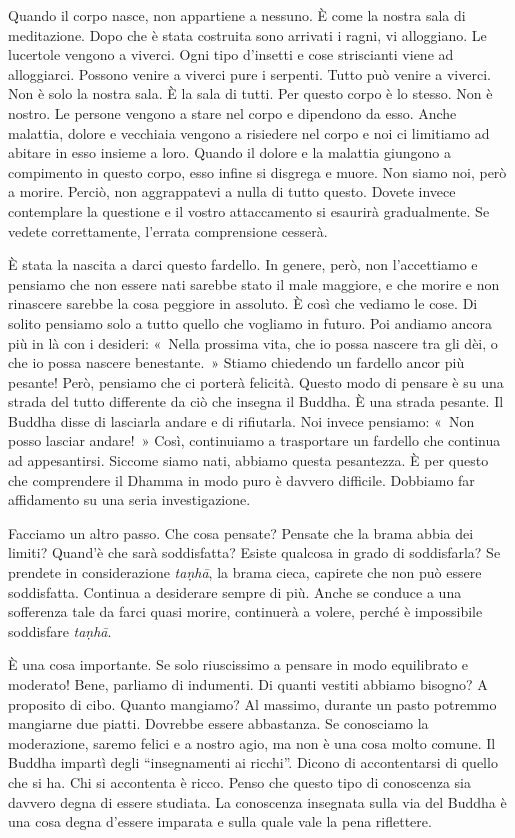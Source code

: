 Quando il corpo nasce, non appartiene a nessuno. È come la nostra sala
di meditazione. Dopo che è stata costruita sono arrivati i ragni, vi
alloggiano. Le lucertole vengono a viverci. Ogni tipo d'insetti e cose
striscianti viene ad alloggiarci. Possono venire a viverci pure i
serpenti. Tutto può venire a viverci. Non è solo la nostra sala. È la
sala di tutti. Per questo corpo è lo stesso. Non è nostro. Le persone
vengono a stare nel corpo e dipendono da esso. Anche malattia, dolore e
vecchiaia vengono a risiedere nel corpo e noi ci limitiamo ad abitare in
esso insieme a loro. Quando il dolore e la malattia giungono a
compimento in questo corpo, esso infine si disgrega e muore. Non siamo
noi, però a morire. Perciò, non aggrappatevi a nulla di tutto questo.
Dovete invece contemplare la questione e il vostro attaccamento si
esaurirà gradualmente. Se vedete correttamente, l'errata comprensione
cesserà.

È stata la nascita a darci questo fardello. In genere, però, non
l'accettiamo e pensiamo che non essere nati sarebbe stato il male
maggiore, e che morire e non rinascere sarebbe la cosa peggiore in
assoluto. È così che vediamo le cose. Di solito pensiamo solo a tutto
quello che vogliamo in futuro. Poi andiamo ancora più in là con i
desideri: «~Nella prossima vita, che io possa nascere tra gli dèi, o che
io possa nascere benestante.~» Stiamo chiedendo un fardello ancor più
pesante! Però, pensiamo che ci porterà felicità. Questo modo di pensare
è su una strada del tutto differente da ciò che insegna il Buddha. È una
strada pesante. Il Buddha disse di lasciarla andare e di rifiutarla. Noi
invece pensiamo: «~Non posso lasciar andare!~» Così, continuiamo a
trasportare un fardello che continua ad appesantirsi. Siccome siamo
nati, abbiamo questa pesantezza. È per questo che comprendere il Dhamma
in modo puro è davvero difficile. Dobbiamo far affidamento su una seria
investigazione.

Facciamo un altro passo. Che cosa pensate? Pensate che la brama abbia
dei limiti? Quand'è che sarà soddisfatta? Esiste qualcosa in grado di
soddisfarla? Se prendete in considerazione \emph{taṇhā}, la brama cieca,
capirete che non può essere soddisfatta. Continua a desiderare sempre di
più. Anche se conduce a una sofferenza tale da farci quasi morire,
continuerà a volere, perché è impossibile soddisfare \emph{taṇhā}.

È una cosa importante. Se solo riuscissimo a pensare in modo equilibrato
e moderato! Bene, parliamo di indumenti. Di quanti vestiti abbiamo
bisogno? A proposito di cibo. Quanto mangiamo? Al massimo, durante un
pasto potremmo mangiarne due piatti. Dovrebbe essere abbastanza. Se
conosciamo la moderazione, saremo felici e a nostro agio, ma non è una
cosa molto comune. Il Buddha impartì degli ``insegnamenti ai ricchi''.
Dicono di accontentarsi di quello che si ha. Chi si accontenta è ricco.
Penso che questo tipo di conoscenza sia davvero degna di essere
studiata. La conoscenza insegnata sulla via del Buddha è una cosa degna
d'essere imparata e sulla quale vale la pena riflettere.

